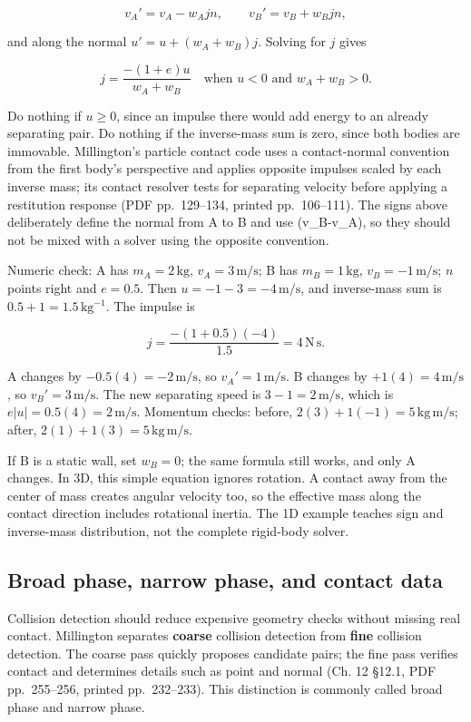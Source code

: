 \[
v_A'=v_A-w_A j n,\qquad v_B'=v_B+w_B j n,
\]

and along the normal \(u'=u+(w_A+w_B)j\). Solving for \(j\) gives

\[
j=\frac{-(1+e)u}{w_A+w_B}\quad\text{when }u<0\text{ and }w_A+w_B>0.
\]

Do nothing if \(u\ge0\), since an impulse there would add energy to an already separating pair. Do nothing if the inverse-mass sum is zero, since both bodies are immovable. Millington's particle contact code uses a contact-normal convention from the first body's perspective and applies opposite impulses scaled by each inverse mass; its contact resolver tests for separating velocity before applying a restitution response (PDF pp.~129--134, printed pp.~106--111). The signs above deliberately define the normal from A to B and use (v\_B-v\_A), so they should not be mixed with a solver using the opposite convention.

Numeric check: A has \(m_A=2\,\mathrm{kg}\), \(v_A=3\,\mathrm{m/s}\); B has \(m_B=1\,\mathrm{kg}\), \(v_B=-1\,\mathrm{m/s}\); \(n\) points right and \(e=0.5\). Then \(u=-1-3=-4\,\mathrm{m/s}\), and inverse-mass sum is \(0.5+1=1.5\,\mathrm{kg^{-1}}\). The impulse is

\[
j=\frac{-(1+0.5)(-4)}{1.5}=4\,\mathrm{N\,s}.
\]

A changes by \(-0.5(4)=-2\,\mathrm{m/s}\), so \(v_A'=1\,\mathrm{m/s}\). B changes by \(+1(4)=4\,\mathrm{m/s}\), so \(v_B'=3\,\mathrm{m/s}\). The new separating speed is \(3-1=2\,\mathrm{m/s}\), which is \(e|u|=0.5(4)=2\,\mathrm{m/s}\). Momentum checks: before, \(2(3)+1(-1)=5\,\mathrm{kg\,m/s}\); after, \(2(1)+1(3)=5\,\mathrm{kg\,m/s}\).

If B is a static wall, set \(w_B=0\); the same formula still works, and only A changes. In 3D, this simple equation ignores rotation. A contact away from the center of mass creates angular velocity too, so the effective mass along the contact direction includes rotational inertia. The 1D example teaches sign and inverse-mass distribution, not the complete rigid-body solver.

\subsection{Broad phase, narrow phase, and contact data}\label{06-engine-ii-ch033-broad-phase-narrow-phase-and-contact-data}

Collision detection should reduce expensive geometry checks without missing real contact. Millington separates \textbf{coarse} collision detection from \textbf{fine} collision detection. The coarse pass quickly proposes candidate pairs; the fine pass verifies contact and determines details such as point and normal (Ch. 12 §12.1, PDF pp.~255--256, printed pp.~232--233). This distinction is commonly called broad phase and narrow phase.

